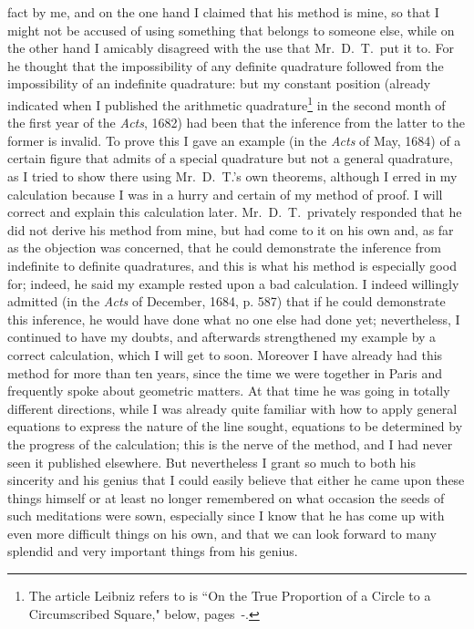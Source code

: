 \documentclass[polutonikogreek,english,twoside,openright]{article}
\begin{document}
fact by me, and on the one hand I claimed that his method is mine, so
that I might not be accused of using something that belongs to someone
else, while on the other hand I amicably disagreed with the use that
Mr.\ D.\ T.\ put it to.  For he thought that the impossibility of any
definite quadrature followed from the impossibility of an indefinite
quadrature: but my constant position (already indicated when I
published the arithmetic quadrature\footnote{The article Leibniz
  refers to is ``On the True Proportion of a Circle to a Circumscribed
  Square," below, pages~\pageref{begtp}-\pageref{endtp}.} in the
second month of the first year of the {\em Acts}, 1682) had been that
the inference from the latter to the former is invalid.  To prove this
I gave an example (in the {\em Acts} of May, 1684) of a certain figure
that admits of a special quadrature but not a general quadrature, as I
tried to show there using Mr.\ D.\ T.'s own theorems, although I erred
in my calculation because I was in a hurry and certain of my method of
proof.  I will correct and explain this calculation later.  Mr.\ D.\
T.\ privately responded that he did not derive his method from mine,
but had come to it on his own and, as far as the objection was
concerned, that he could demonstrate the inference from indefinite to
definite quadratures, and this is what his method is especially good
for; indeed, he said my example rested upon a bad calculation.  I
indeed willingly admitted (in the {\em Acts} of December, 1684,
p. 587) that if he could demonstrate this inference, he would have
done what no one else had done yet; nevertheless, I continued to have
my doubts, and afterwards strengthened my example by a correct
calculation, which I will get to soon.  Moreover I have already had
this method for more than ten years, since the time we were together
in Paris and frequently spoke about geometric matters.  At that time
he was going in totally different directions, while I was already
quite familiar with how to apply general equations to express the
nature of the line sought, equations to be determined by the progress
of the calculation; this is the nerve of the method, and I had never
seen it published elsewhere.  But nevertheless I grant so much to both
his sincerity and his genius that I could easily believe that either
he came upon these things himself or at least no longer remembered on
what occasion the seeds of such meditations were sown, especially
since I know that he has come up with even more difficult things on
his own, and that we can look forward to many splendid and very
important things from his genius.
\end{document}
